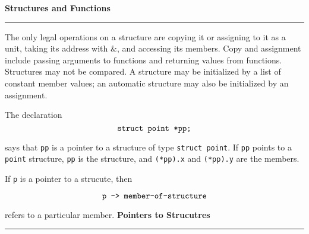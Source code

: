\filbreak
\vskip 1cm
{\bf Structures and Functions}
\vskip 1mm
\hrule

\vskip 1mm
The only legal operations on a structure are copying it or assigning to it as a unit, taking its address with $\&$, and accessing its members. Copy and assignment include passing arguments to functions and returning values from functions. Structures may not be compared. A structure may be initialized by a list of constant member values; an automatic structure may also be initialized by an assignment.

\filbreak
\vskip 1cm
The declaration
$$\hbox{{\tt struct point *pp;}}$$

says that {\tt pp} is a pointer to a structure of type {\tt struct point}. If {\tt pp} points to a {\tt point} structure, {\tt *pp} is the structure, and {\tt (*pp).x} and {\tt (*pp).y} are the members.

\filbreak
\vskip 1cm
If {\tt p} is a pointer to a strucute, then

$$\hbox{{\tt p -> member-of-structure}}$$

refers to a particular member.
%
%
\filbreak
\vskip 1cm
{\bf Pointers to Strucutres}
\vskip 1mm
\hrule
\vskip 1mm

\filbreak
\vfill\eject
\bye
